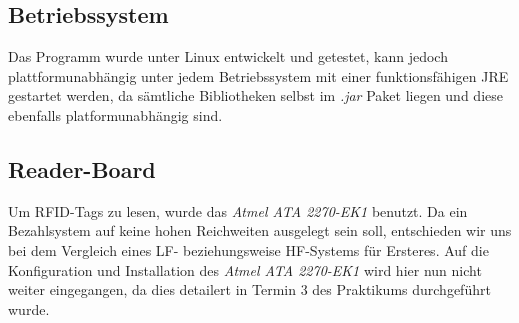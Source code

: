 \documentclass[11pt]{article} %
\begin{document}
\subsection{Betriebssystem}
Das Programm wurde unter Linux entwickelt und getestet, kann jedoch
plattformunabhängig unter jedem Betriebssystem mit einer funktionsfähigen JRE
gestartet werden, da sämtliche Bibliotheken selbst im \textit{.jar} Paket liegen
und diese ebenfalls platformunabhängig sind.
\subsection{Reader-Board}
Um RFID-Tags zu lesen, wurde das \textit{Atmel ATA 2270-EK1} benutzt. Da ein
Bezahlsystem auf keine hohen Reichweiten ausgelegt sein soll, entschieden wir
uns bei dem Vergleich eines LF- beziehungsweise HF-Systems für Ersteres. Auf die
Konfiguration und Installation des \textit{Atmel ATA 2270-EK1} wird hier nun
nicht weiter eingegangen, da dies detailert in Termin 3 des Praktikums
durchgeführt wurde.
\end{document}
